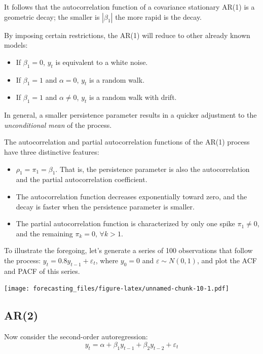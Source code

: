 \documentclass[
  12pt,
  oneside]{book}
\providecommand{\tightlist}{%
  \setlength{\itemsep}{0pt}\setlength{\parskip}{0pt}}
\begin{document}
It follows that the autocorrelation function of a covariance stationary AR(1) is a geometric decay; the smaller is \(|\beta_1|\) the more rapid is the decay.

By imposing certain restrictions, the AR(1) will reduce to other already known models:

\begin{itemize}
\tightlist
\item
  If \(\beta_1 = 0\), \(y_t\) is equivalent to a white noise.
\item
  If \(\beta_1 = 1\) and \(\alpha = 0\), \(y_t\) is a random walk.
\item
  If \(\beta_1 = 1\) and \(\alpha \neq 0\), \(y_t\) is a random walk with drift.
\end{itemize}

In general, a smaller persistence parameter results in a quicker adjustment to the \emph{unconditional mean} of the process.

The autocorrelation and partial autocorrelation functions of the AR(1) process have three distinctive features:

\begin{itemize}
\tightlist
\item
  \(\rho_1 = \pi_1 = \beta_1\). That is, the persistence parameter is also the autocorrelation and the partial autocorrelation coefficient.
\item
  The autocorrelation function decreases exponentially toward zero, and the decay is faster when the persistence parameter is smaller.
\item
  The partial autocorrelation function is characterized by only one spike \(\pi_1 \neq 0\), and the remaining \(\pi_k = 0\), \(\forall k > 1\).
\end{itemize}

To illustrate the foregoing, let's generate a series of 100 observations that follow the process: \(y_t=0.8y_{t-1}+\varepsilon_t\), where \(y_0=0\) and \(\varepsilon\sim N(0,1)\), and plot the ACF and PACF of this series.

\texttt{[image: forecasting\_files/figure-latex/unnamed-chunk-10-1.pdf]}

\hypertarget{ar2}{%
\subsection{AR(2)}\label{ar2}}

Now consider the second-order autoregression: \[y_t = \alpha + \beta_1 y_{t-1} + \beta_2 y_{t-2} + \varepsilon_t\]
\end{document}
